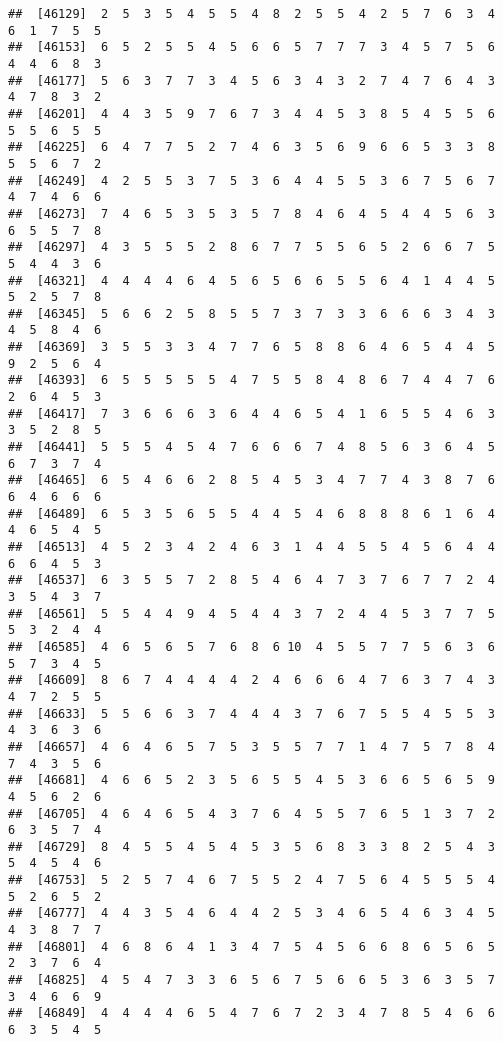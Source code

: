 \documentclass[
]{book}
\begin{document}
\begin{verbatim}
##  [46129]  2  5  3  5  4  5  5  4  8  2  5  5  4  2  5  7  6  3  4  6  1  7  5  5
##  [46153]  6  5  2  5  5  4  5  6  6  5  7  7  7  3  4  5  7  5  6  4  4  6  8  3
##  [46177]  5  6  3  7  7  3  4  5  6  3  4  3  2  7  4  7  6  4  3  4  7  8  3  2
##  [46201]  4  4  3  5  9  7  6  7  3  4  4  5  3  8  5  4  5  5  6  5  5  6  5  5
##  [46225]  6  4  7  7  5  2  7  4  6  3  5  6  9  6  6  5  3  3  8  5  5  6  7  2
##  [46249]  4  2  5  5  3  7  5  3  6  4  4  5  5  3  6  7  5  6  7  4  7  4  6  6
##  [46273]  7  4  6  5  3  5  3  5  7  8  4  6  4  5  4  4  5  6  3  6  5  5  7  8
##  [46297]  4  3  5  5  5  2  8  6  7  7  5  5  6  5  2  6  6  7  5  5  4  4  3  6
##  [46321]  4  4  4  4  6  4  5  6  5  6  6  5  5  6  4  1  4  4  5  5  2  5  7  8
##  [46345]  5  6  6  2  5  8  5  5  7  3  7  3  3  6  6  6  3  4  3  4  5  8  4  6
##  [46369]  3  5  5  3  3  4  7  7  6  5  8  8  6  4  6  5  4  4  5  9  2  5  6  4
##  [46393]  6  5  5  5  5  5  4  7  5  5  8  4  8  6  7  4  4  7  6  2  6  4  5  3
##  [46417]  7  3  6  6  6  3  6  4  4  6  5  4  1  6  5  5  4  6  3  3  5  2  8  5
##  [46441]  5  5  5  4  5  4  7  6  6  6  7  4  8  5  6  3  6  4  5  6  7  3  7  4
##  [46465]  6  5  4  6  6  2  8  5  4  5  3  4  7  7  4  3  8  7  6  6  4  6  6  6
##  [46489]  6  5  3  5  6  5  5  4  4  5  4  6  8  8  8  6  1  6  4  4  6  5  4  5
##  [46513]  4  5  2  3  4  2  4  6  3  1  4  4  5  5  4  5  6  4  4  6  6  4  5  3
##  [46537]  6  3  5  5  7  2  8  5  4  6  4  7  3  7  6  7  7  2  4  3  5  4  3  7
##  [46561]  5  5  4  4  9  4  5  4  4  3  7  2  4  4  5  3  7  7  5  5  3  2  4  4
##  [46585]  4  6  5  6  5  7  6  8  6 10  4  5  5  7  7  5  6  3  6  5  7  3  4  5
##  [46609]  8  6  7  4  4  4  4  2  4  6  6  6  4  7  6  3  7  4  3  4  7  2  5  5
##  [46633]  5  5  6  6  3  7  4  4  4  3  7  6  7  5  5  4  5  5  3  4  3  6  3  6
##  [46657]  4  6  4  6  5  7  5  3  5  5  7  7  1  4  7  5  7  8  4  7  4  3  5  6
##  [46681]  4  6  6  5  2  3  5  6  5  5  4  5  3  6  6  5  6  5  9  4  5  6  2  6
##  [46705]  4  6  4  6  5  4  3  7  6  4  5  5  7  6  5  1  3  7  2  6  3  5  7  4
##  [46729]  8  4  5  5  4  5  4  5  3  5  6  8  3  3  8  2  5  4  3  5  4  5  4  6
##  [46753]  5  2  5  7  4  6  7  5  5  2  4  7  5  6  4  5  5  5  4  5  2  6  5  2
##  [46777]  4  4  3  5  4  6  4  4  2  5  3  4  6  5  4  6  3  4  5  4  3  8  7  7
##  [46801]  4  6  8  6  4  1  3  4  7  5  4  5  6  6  8  6  5  6  5  2  3  7  6  4
##  [46825]  4  5  4  7  3  3  6  5  6  7  5  6  6  5  3  6  3  5  7  3  4  6  6  9
##  [46849]  4  4  4  4  6  5  4  7  6  7  2  3  4  7  8  5  4  6  6  6  3  5  4  5

\end{verbatim}
\end{document}
